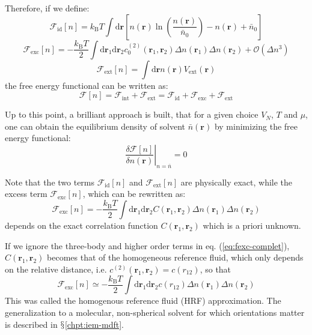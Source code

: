 Therefore, if we define:
\begin{equation}
\mathcal{F}_{\mathrm{id}}[n]=k_{\mathrm{B}}T\int\mathrm{d}\mathbf{r}\left[n(\mathbf{r})\ln\left(\dfrac{n(\mathbf{r})}{\bar{n}_{0}}\right)-n(\mathbf{r})+\bar{n}_{0}\right]
\end{equation}
\begin{equation}
\mathcal{F}_{\mathrm{exc}}[n]=-\frac{k_{\mathrm{B}}T}{2}\int\mathrm{d}\mathbf{\mathbf{r}}_{1}\mathrm{d}\mathbf{r}_{2}c_{0}^{(2)}(\mathbf{r}_{1},\mathbf{r}_{2})\Delta n(\mathbf{r}_{1})\Delta n(\mathbf{r}_{2})+\mathcal{O}(\Delta n{}^{3})\label{eq:fexc-complet}
\end{equation}
\begin{equation}
\mathcal{F}_{\mathrm{ext}}[n]=\int\mathrm{d}\mathbf{r}n(\mathbf{r})V_{\mathrm{ext}}(\mathbf{r})
\end{equation}
the free energy functional can be written as:
\begin{equation}
\mathcal{F}[n]=\mathcal{F}_{\mathrm{int}}+\mathcal{F}_{\mathrm{ext}}=\mathcal{F}_{\mathrm{id}}+\mathcal{F}_{\mathrm{exc}}+\mathcal{F}_{\mathrm{ext}}
\end{equation}

Up to this point, a brilliant approach is built, that for a given
choice $V_{N}$, $T$ and $\mu$, one can obtain the equilibrium density
of solvent $\bar{n}(\mathbf{r})$ by minimizing the free energy functional:
\begin{equation}
\left.\frac{\delta\mathcal{F}[n]}{\delta n(\mathbf{r})}\right|_{n=\bar{n}}=0\label{eq:1.59}
\end{equation}

Note that the two terms $\mathcal{F}_{\mathrm{id}}[n]$ and $\mathcal{F}_{\mathrm{ext}}[n]$
are physically exact, while the excess term $\mathcal{F}_{\mathrm{exc}}[n]$,
which can be rewritten as:
\begin{equation}
\mathcal{F}_{\mathrm{exc}}[n]=-\frac{k_{\mathrm{B}}T}{2}\int\mathrm{d}\mathbf{\mathbf{r}}_{1}\mathrm{d}\mathbf{r}_{2}C(\mathbf{r}_{1},\mathbf{r}_{2})\Delta n(\mathbf{r}_{1})\Delta n(\mathbf{r}_{2})
\end{equation}
depends on the exact correlation function $C(\mathbf{r}_{1},\mathbf{r}_{2})$
which is a priori unknown.

If we ignore the three-body and higher order terms in eq. (\ref{eq:fexc-complet}),
$C(\mathbf{r}_{1},\mathbf{r}_{2})$ becomes that of the homogeneous
reference fluid, which only depends on the relative distance, i.e.
$c^{(2)}(\mathbf{r}_{1},\mathbf{r}_{2})=c(r_{12})$, so that
\begin{equation}
\mathcal{F}_{\mathrm{exc}}\left[n\right]\simeq-\frac{k_{\mathrm{B}}T}{2}\int\mathrm{d}\mathbf{\mathbf{r}}_{1}\mathrm{d}\mathbf{r}_{2}c(r_{12})\Delta n(\mathbf{r}_{1})\Delta n(\mathbf{r}_{2})
\end{equation}
This was called the homogenous reference fluid (\acs{HRF}) approximation.
The generalization to a molecular, non-spherical solvent for which
orientations matter is described in $\mathsection$\ref{chpt:iem-mdft}.

